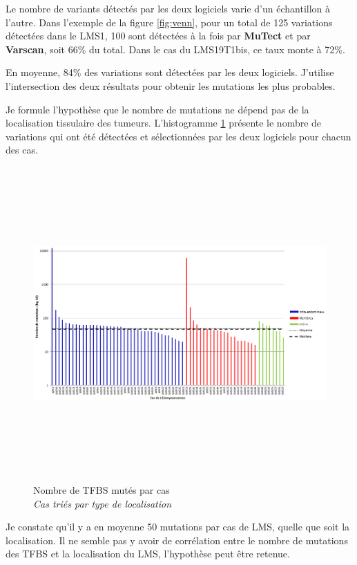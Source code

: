 Le nombre de variants détectés par les deux logiciels varie d'un échantillon à l'autre.  Dans l'exemple de la figure \ref{fig:venn}, pour un total de 125 variations détectées dans le LMS1, 100 sont détectées à la fois par \textbf{MuTect} et par \textbf{Varscan}, soit 66\% du total. Dans le cas du LMS19T1bis, ce taux monte à 72\%.

En moyenne, 84\% des variations sont détectées par les deux logiciels. J'utilise l'intersection des deux résultats pour obtenir les mutations les plus probables.

\newpage

Je formule l'hypothèse que le nombre de mutations ne dépend pas de la localisation tissulaire des tumeurs. L'histogramme \ref{fig:mut} présente le nombre de variations qui ont été détectées et sélectionnées par les deux logiciels pour chacun des cas. 

\begin{figure}[h]
\centering
\includegraphics[width=18cm,height=12cm]{Figures/mutations.png}
\captionsetup{justification=centering}
\caption{Nombre de TFBS mutés par cas \\ 
\textit{Cas triés par type de localisation}}
\label{fig:mut}
\end{figure}

Je constate qu'il y a en moyenne 50 mutations par cas de LMS, quelle que soit la localisation. Il ne semble pas y avoir de corrélation entre le nombre de mutations des TFBS et la localisation du LMS, l'hypothèse peut être retenue.

